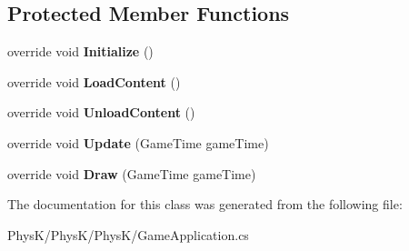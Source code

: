 \subsection*{Protected Member Functions}
\begin{DoxyCompactItemize}
\item 
override void {\bfseries Initialize} ()\hypertarget{class_phys_k_1_1_game_application_a3b3811ce806ca5d00c3ee63ca223db61}{}\label{class_phys_k_1_1_game_application_a3b3811ce806ca5d00c3ee63ca223db61}

\item 
override void {\bfseries Load\+Content} ()\hypertarget{class_phys_k_1_1_game_application_a12d154ea239feafcb1f684b0a2332e20}{}\label{class_phys_k_1_1_game_application_a12d154ea239feafcb1f684b0a2332e20}

\item 
override void {\bfseries Unload\+Content} ()\hypertarget{class_phys_k_1_1_game_application_a5d385e16e5dd5a5b3ab6bf8ce0b8c70f}{}\label{class_phys_k_1_1_game_application_a5d385e16e5dd5a5b3ab6bf8ce0b8c70f}

\item 
override void {\bfseries Update} (Game\+Time game\+Time)\hypertarget{class_phys_k_1_1_game_application_a6fd86dfa9ddbecbb7c6e856ca6384b2f}{}\label{class_phys_k_1_1_game_application_a6fd86dfa9ddbecbb7c6e856ca6384b2f}

\item 
override void {\bfseries Draw} (Game\+Time game\+Time)\hypertarget{class_phys_k_1_1_game_application_a5871c20adb8aa224a4eb0f6e33237c93}{}\label{class_phys_k_1_1_game_application_a5871c20adb8aa224a4eb0f6e33237c93}

\end{DoxyCompactItemize}


The documentation for this class was generated from the following file\+:\begin{DoxyCompactItemize}
\item 
Phys\+K/\+Phys\+K/\+Phys\+K/Game\+Application.\+cs\end{DoxyCompactItemize}

